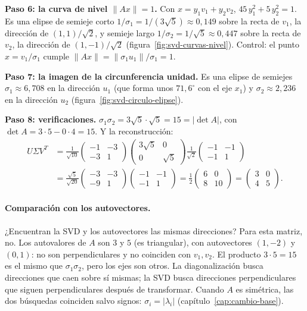 \begin{ejemplo}[SVD a mano de \(A=\left(\begin{smallmatrix}3&0\\4&5\end{smallmatrix}\right)\)]
\textbf{Paso 6: la curva de nivel \(\|Ax\|=1\).} Con \(x=y_1v_1+y_2v_2\),
\(45\,y_1^2+5\,y_2^2=1\). Es una elipse de semieje corto \(1/\sigma_1=1/(3\sqrt5)\approx0{,}149\)
sobre la recta de \(v_1\), la dirección de \((1,1)/\sqrt2\), y semieje largo
\(1/\sigma_2=1/\sqrt5\approx0{,}447\) sobre la recta de \(v_2\), la dirección de
\((1,-1)/\sqrt2\) (figura~\ref{fig:svd-curvas-nivel}). Control: el punto
\(x=v_1/\sigma_1\) cumple \(\|Ax\|=\|\sigma_1u_1\|/\sigma_1=1\).

\textbf{Paso 7: la imagen de la circunferencia unidad.} Es una elipse de semiejes
\(\sigma_1\approx6{,}708\) en la dirección \(u_1\) (que forma unos \(71{,}6^\circ\) con el
eje \(x_1\)) y \(\sigma_2\approx2{,}236\) en la dirección \(u_2\)
(figura~\ref{fig:svd-circulo-elipse}).

\textbf{Paso 8: verificaciones.} \(\sigma_1\sigma_2=3\sqrt5\cdot\sqrt5=15=|\det A|\), con
\(\det A=3\cdot5-0\cdot4=15\). Y la reconstrucción:
\begin{align*}
  U\Sigma V^T&=\frac1{\sqrt{10}}\begin{pmatrix}-1&-3\\-3&1\end{pmatrix}
  \begin{pmatrix}3\sqrt5&0\\0&\sqrt5\end{pmatrix}
  \frac1{\sqrt2}\begin{pmatrix}-1&-1\\-1&1\end{pmatrix}\\
  &=\frac{\sqrt5}{\sqrt{20}}\begin{pmatrix}-3&-3\\-9&1\end{pmatrix}\begin{pmatrix}-1&-1\\-1&1\end{pmatrix}
  =\frac12\begin{pmatrix}6&0\\8&10\end{pmatrix}=\begin{pmatrix}3&0\\4&5\end{pmatrix}.
\end{align*}
\end{ejemplo}

\paragraph{Comparación con los autovectores.} ¿Encuentran la SVD y los autovectores las
mismas direcciones? Para esta matriz, no. Los autovalores de \(A\) son \(3\) y \(5\)
(es triangular), con autovectores \((1,-2)\) y \((0,1)\): no son perpendiculares y no
coinciden con \(v_1,v_2\). El producto \(3\cdot5=15\) es el mismo que \(\sigma_1\sigma_2\),
pero los ejes son otros. La diagonalización busca direcciones que caen sobre sí mismas; la
SVD busca direcciones perpendiculares que siguen perpendiculares después de transformar.
Cuando \(A\) es simétrica, las dos búsquedas coinciden salvo signos: \(\sigma_i=|\lambda_i|\)
(capítulo~\ref{cap:cambio-base}).


